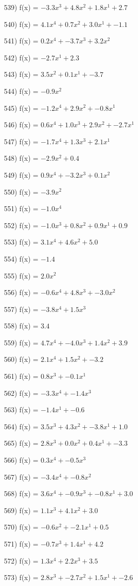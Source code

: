 \documentclass[10pt,a4paper]{article}
\begin{document}
539) f(x) = $-3.3x^3 + 4.8x^2 + 1.8x^1 + 2.7$

540) f(x) = $4.1x^4 + 0.7x^2 + 3.0x^1 + -1.1$

541) f(x) = $0.2x^4 + -3.7x^3 + 3.2x^2$

542) f(x) = $-2.7x^1 + 2.3$

543) f(x) = $3.5x^2 + 0.1x^1 + -3.7$

544) f(x) = $-0.9x^2$

545) f(x) = $-1.2x^4 + 2.9x^2 + -0.8x^1$

546) f(x) = $0.6x^4 + 1.0x^3 + 2.9x^2 + -2.7x^1$

547) f(x) = $-1.7x^4 + 1.3x^3 + 2.1x^1$

548) f(x) = $-2.9x^2 + 0.4$

549) f(x) = $0.9x^4 + -3.2x^3 + 0.1x^2$

550) f(x) = $-3.9x^2$

551) f(x) = $-1.0x^4$

552) f(x) = $-1.0x^3 + 0.8x^2 + 0.9x^1 + 0.9$

553) f(x) = $3.1x^4 + 4.6x^2 + 5.0$

554) f(x) = $-1.4$

555) f(x) = $2.0x^2$

556) f(x) = $-0.6x^4 + 4.8x^3 + -3.0x^2$

557) f(x) = $-3.8x^4 + 1.5x^3$

558) f(x) = $3.4$

559) f(x) = $4.7x^4 + -4.0x^3 + 1.4x^2 + 3.9$

560) f(x) = $2.1x^4 + 1.5x^2 + -3.2$

561) f(x) = $0.8x^3 + -0.1x^1$

562) f(x) = $-3.3x^4 + -1.4x^3$

563) f(x) = $-1.4x^1 + -0.6$

564) f(x) = $3.5x^3 + 4.3x^2 + -3.8x^1 + 1.0$

565) f(x) = $2.8x^3 + 0.0x^2 + 0.4x^1 + -3.3$

566) f(x) = $0.3x^4 + -0.5x^3$

567) f(x) = $-3.4x^4 + -0.8x^2$

568) f(x) = $3.6x^4 + -0.9x^3 + -0.8x^1 + 3.0$

569) f(x) = $1.1x^3 + 4.1x^2 + 3.0$

570) f(x) = $-0.6x^2 + -2.1x^1 + 0.5$

571) f(x) = $-0.7x^3 + 1.4x^1 + 4.2$

572) f(x) = $1.3x^4 + 2.2x^3 + 3.5$

573) f(x) = $2.8x^3 + -2.7x^2 + 1.5x^1 + -2.6$
\end{document}
